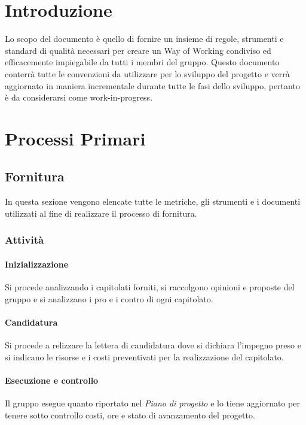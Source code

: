 \documentclass[12pt]{article}
\begin{document}
\tableofcontents

\pagebreak

\printindex


\section{Introduzione}
Lo scopo del documento è quello di fornire un insieme di regole, strumenti e standard di qualità necessari per creare un Way of Working condiviso ed efficacemente impiegabile da tutti i membri del gruppo.
Questo documento conterrà tutte le convenzioni da utilizzare per lo sviluppo del progetto e verrà aggiornato in maniera incrementale durante tutte le fasi dello sviluppo, pertanto è da considerarsi come work-in-progress.


\section{Processi Primari}
\subsection{Fornitura}
In questa sezione vengono elencate tutte le metriche, gli strumenti e i documenti utilizzati al fine di
realizzare il processo di fornitura.

\subsubsection{Attività}
\paragraph{Inizializzazione}
Si procede analizzando i capitolati forniti, si raccolgono opinioni e proposte del gruppo e si analizzano i pro e i contro di ogni capitolato.

\paragraph{Candidatura}
Si procede a relizzare la lettera di candidatura dove si dichiara l'impegno preso e si indicano le risorse e i costi preventivati per la realizzazione del capitolato.

\paragraph{Esecuzione e controllo}
Il gruppo esegue quanto riportato nel \textit{Piano di progetto} e lo tiene aggiornato per tenere sotto controllo costi, ore e stato di avanzamento del progetto.
\end{document}
